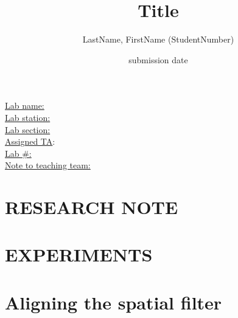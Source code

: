 \documentclass[amsmath,amssymb,12pt]{article}
\begin{document}
\title{Title}
\author{LastName, FirstName (StudentNumber)}
\date{submission date}
\maketitle

\noindent
\underline{Lab name:} \\
\underline{Lab station:} \\
\underline{Lab section:} \\
\underline{Assigned TA}: \\
\underline{Lab \#:} \\
\underline{Note to teaching team:}
\vspace{\baselineskip}  %

\begin{abstract}

\end{abstract}

\setcounter{section}{0}
\setcounter{subsection}{0}

\newpage
\section*{RESEARCH NOTE}  %



\newpage
\section*{EXPERIMENTS}  %
\section{}

\section{Aligning the spatial filter}
\end{document}
